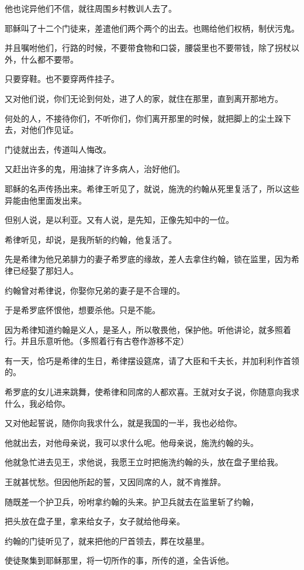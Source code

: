 \documentclass[12pt,oneside]{book}
\begin{document}
他也诧异他们不信，就往周围乡村教训人去了。

耶稣叫了十二个门徒来，差遣他们两个两个的出去。也赐给他们权柄，制伏污鬼。

并且嘱咐他们，行路的时候，不要带食物和口袋，腰袋里也不要带钱，除了拐杖以外，什么都不要带。

只要穿鞋。也不要穿两件挂子。

又对他们说，你们无论到何处，进了人的家，就住在那里，直到离开那地方。

何处的人，不接待你们，不听你们，你们离开那里的时候，就把脚上的尘土跺下去，对他们作见证。

门徒就出去，传道叫人悔改。

又赶出许多的鬼，用油抹了许多病人，治好他们。

耶稣的名声传扬出来。希律王听见了，就说，施洗的约翰从死里复活了，所以这些异能由他里面发出来。

但别人说，是以利亚。又有人说，是先知，正像先知中的一位。

希律听见，却说，是我所斩的约翰，他复活了。

先是希律为他兄弟腓力的妻子希罗底的缘故，差人去拿住约翰，锁在监里，因为希律已经娶了那妇人。

约翰曾对希律说，你娶你兄弟的妻子是不合理的。

于是希罗底怀恨他，想要杀他。只是不能。

因为希律知道约翰是义人，是圣人，所以敬畏他，保护他。听他讲论，就多照着行。并且乐意听他。（多照着行有古卷作游移不定）

有一天，恰巧是希律的生日，希律摆设筵席，请了大臣和千夫长，并加利利作首领的。

希罗底的女儿进来跳舞，使希律和同席的人都欢喜。王就对女子说，你随意向我求什么，我必给你。

又对他起誓说，随你向我求什么，就是我国的一半，我也必给你。

他就出去，对他母亲说，我可以求什么呢。他母亲说，施洗约翰的头。

他就急忙进去见王，求他说，我愿王立时把施洗约翰的头，放在盘子里给我。

王就甚忧愁。但因他所起的誓，又因同席的人，就不肯推辞。

随既差一个护卫兵，吩咐拿约翰的头来。护卫兵就去在监里斩了约翰，

把头放在盘子里，拿来给女子，女子就给他母亲。

约翰的门徒听见了，就来把他的尸首领去，葬在坟墓里。

使徒聚集到耶稣那里，将一切所作的事，所传的道，全告诉他。
\end{document}
